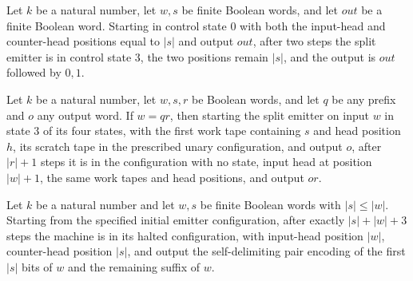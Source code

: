 \begin{lemma}
\label{Turing.FinTM.splitEmit_separator}
\leanok
{}
Let $k$ be a natural number, let $w,s$ be finite Boolean words, and let $out$ be a
finite Boolean word. Starting in control state $0$ with both the input-head and
counter-head positions equal to $|s|$ and output $out$, after two steps the split
emitter is in control state $3$, the two positions remain $|s|$, and the output is $out$
followed by $0,1$.
\end{lemma}

\begin{lemma}
\label{Turing.FinTM.splitEmit_suffix}
\leanok
{}
Let $k$ be a natural number, let $w,s,r$ be Boolean words, and let $q$ be any prefix and
$o$ any output word. If $w=q r$, then starting the split emitter on input $w$ in state
$3$ of its four states, with the first work tape containing $s$ and head position $h$,
its scratch tape in the prescribed unary configuration, and output $o$, after $|r|+1$
steps it is in the configuration with no state, input head at position $|w|+1$, the same
work tapes and head positions, and output $o r$.
\end{lemma}

\begin{lemma}
\label{Turing.FinTM.splitEmit_run}
\leanok
{}
Let $k$ be a natural number and let $w,s$ be finite Boolean words with $|s|\le |w|$.
Starting from the specified initial emitter configuration, after exactly $|s|+|w|+3$
steps the machine is in its halted configuration, with input-head position $|w|$,
counter-head position $|s|$, and output the self-delimiting pair encoding of the first
$|s|$ bits of $w$ and the remaining suffix of $w$.
\end{lemma}

